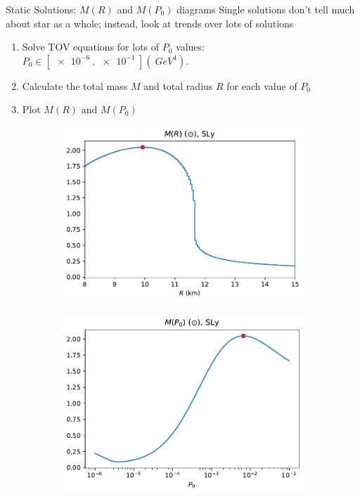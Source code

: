 \documentclass[handout]{beamer}
\begin{document}
    \begin{frame}{Static Solutions: $M(R)$ and $M(P_0)$ diagrams}
        \pause
        Single solutions don't tell much about star as a whole; instead, look at trends over lots of solutions
        \begin{enumerate}
            \item Solve TOV equations for lots of $P_0$ values: \pause $P_0 \in [\SI{e-6}{}, \SI{e-1}{}](\SI{}{GeV^4}).$\pause
            \item Calculate the total mass $M$ and total radius $R$ for each value of $P_0$ \pause
            \item Plot $M(R)$ and $M(P_0)$\pause
        \end{enumerate}

        \begin{figure}[h!]
            \centering
            \begin{subfigure}{.5\textwidth}
                \includegraphics[width = \textwidth]{r_analysis,SLy.pdf}
            \end{subfigure}%
            \begin{subfigure}{.5\textwidth}
                \includegraphics[width = \textwidth]{p0_analysis,SLy.pdf}

\end{subfigure}
\end{figure}
\end{frame}
\end{document}
